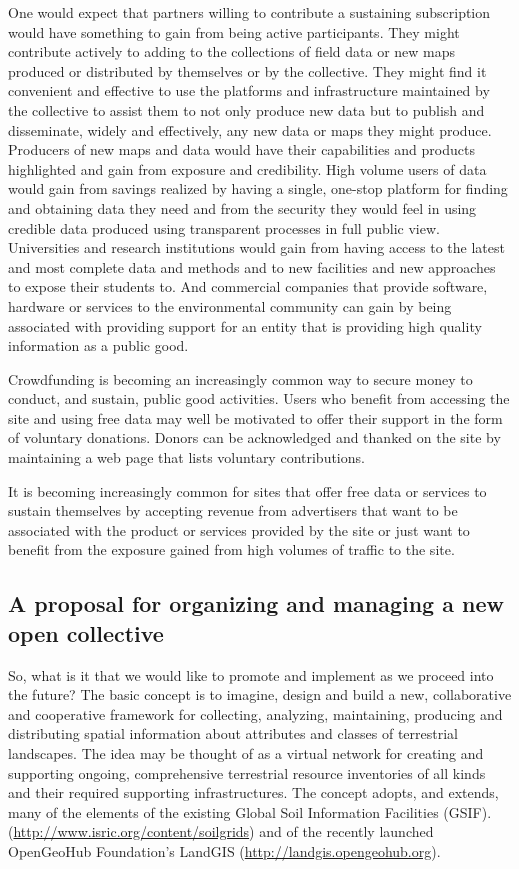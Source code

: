 \documentclass[graybox,natbib,nospthms,UStrade]{svmono}
\begin{document}
One would expect that partners willing to contribute a sustaining
subscription would have something to gain from being active
participants. They might contribute actively to adding to the
collections of field data or new maps produced or distributed by
themselves or by the collective. They might find it convenient and
effective to use the platforms and infrastructure maintained by the
collective to assist them to not only produce new data but to publish
and disseminate, widely and effectively, any new data or maps they might
produce. Producers of new maps and data would have their capabilities
and products highlighted and gain from exposure and credibility. High
volume users of data would gain from savings realized by having a
single, one-stop platform for finding and obtaining data they need and
from the security they would feel in using credible data produced using
transparent processes in full public view. Universities and research
institutions would gain from having access to the latest and most
complete data and methods and to new facilities and new approaches to
expose their students to. And commercial companies that provide
software, hardware or services to the environmental community can gain
by being associated with providing support for an entity that is
providing high quality information as a public good.

Crowdfunding is becoming an increasingly common way to secure money to
conduct, and sustain, public good activities. Users who benefit from
accessing the site and using free data may well be motivated to offer
their support in the form of voluntary donations. Donors can be
acknowledged and thanked on the site by maintaining a web page that
lists voluntary contributions.

It is becoming increasingly common for sites that offer free data or
services to sustain themselves by accepting revenue from advertisers
that want to be associated with the product or services provided by the
site or just want to benefit from the exposure gained from high volumes
of traffic to the site.

\hypertarget{a-proposal-for-organizing-and-managing-a-new-open-collective}{%
\subsection{A proposal for organizing and managing a new open collective}\label{a-proposal-for-organizing-and-managing-a-new-open-collective}}

So, what is it that we would like to promote and implement as we proceed
into the future? The basic concept is to imagine, design and build a new, collaborative
and cooperative framework for collecting, analyzing, maintaining,
producing and distributing spatial information about attributes and
classes of terrestrial landscapes. The idea may be thought of as a
virtual network for creating and supporting ongoing, comprehensive
terrestrial resource inventories of all kinds and their required
supporting infrastructures. The concept adopts, and extends, many of the
elements of the existing Global Soil Information Facilities (GSIF).
(\url{http://www.isric.org/content/soilgrids}) and of the recently launched
OpenGeoHub Foundation's LandGIS (\url{http://landgis.opengeohub.org}).
\end{document}
